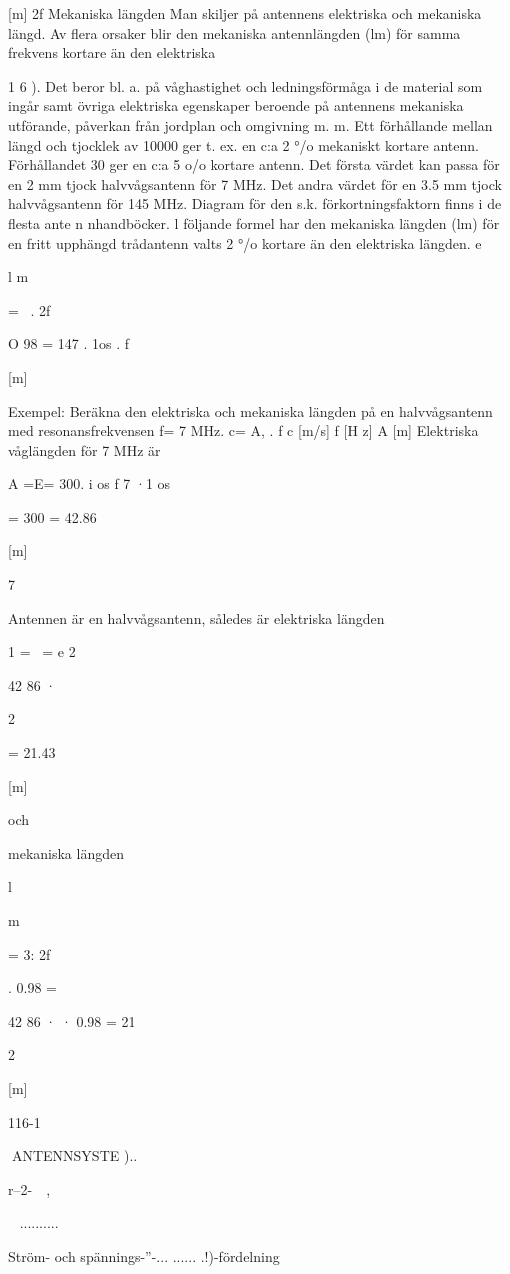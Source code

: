 [m]
2f
Mekaniska längden
Man skiljer på antennens elektriska och
mekaniska längd. Av flera orsaker blir den
mekaniska antennlängden (lm) för samma
frekvens kortare än den elektriska {1 6 ). Det
beror bl. a. på våghastighet och ledningsförmåga i de material som ingår samt övriga
elektriska egenskaper beroende på antennens mekaniska utförande, påverkan från
jordplan och omgivning m. m.
Ett förhållande mellan längd och tjocklek
av 10000 ger t. ex. en c:a 2 °/o mekaniskt
kortare antenn. Förhållandet 30 ger en c:a 5
o/o kortare antenn. Det första värdet kan
passa för en 2 mm tjock halvvågsantenn för
7 MHz. Det andra värdet för en 3.5 mm tjock
halvvågsantenn för 145 MHz. Diagram för
den s.k. förkortningsfaktorn finns i de flesta
ante n nhandböcker.
l följande formel har den mekaniska längden (lm) för en fritt upphängd trådantenn
valts 2 °/o kortare än den elektriska längden.
e

l
m

=~ .
2f

O 98 = 147 . 1os
.
f

[m]

Exempel: Beräkna den elektriska och mekaniska längden på en halvvågsantenn med
resonansfrekvensen f= 7 MHz.
c= A, . f
c [m/s] f [H z] A [m]
Elektriska våglängden för 7 MHz är

A =E= 300. i os
f
7 ·1 os

= 300 = 42.86

[m]

7

Antennen är en halvvågsantenn, således är
elektriska längden

1 =~ =
e
2

42 86
·

2

= 21.43

[m]

och

mekaniska längden

l

m

= 3:
2f

. 0.98 =

42 86
· · 0.98 = 21

2

[m]

116-1

ANTENNSYSTE
)..

r--2-~~,

~
..........

Ström- och spännings-''-... ...... .!)-fördelning

}
